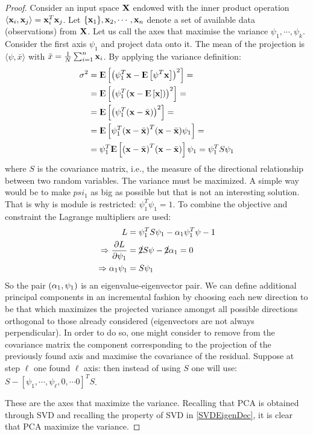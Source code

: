 \begin{theorem}{}
\label{PCAmaxVar}
\begin{proof}
Consider an input space $\mathrm{\mathbf{X}}$ endowed with the inner product operation $\langle \mathbf{x}_i, \mathbf{x}_j\rangle = \mathbf{x}_i^T \mathbf{x}_j$. Let $\{\mathbf{x}_1\}, \mathbf{x}_2, \cdots, \mathbf{x}_n$ denote a set of available data (observations) from $\mathrm{\mathbf{X}}$. Let us call the axes that maximise the variance $\psi_1, \cdots, \psi_k$. Consider the first axis $\psi_1$ and project data onto it. The mean of the projection is $\langle \psi, \bar{x}\rangle$ with $\bar{x} = \frac{1}{N} \sum_{i=1}^n \mathbf{x}_i$.
By applying the variance definition:
\begin{equation}
\begin{aligned}
\sigma^2 &= \E\left[ \br{\psi_1^T\x -\E\left[ \psi^T\x\right]}^2 \right] = \\
&= \E\left[ \br{\psi_1^T\br{\x - \E\left[\x\right]}}^2 \right] = \\
&= \E\left[ \br{\psi_1^T\br{\x - \bar{\x}}}^2 \right] = \\
&= \E\left[ \psi_1^T\br{\x - \bar{\x}}^T\br{\x - \bar{\x}}\psi_1 \right] = \\
&= \psi_1^T\E\left[ \br{\x - \bar{\x}}^T\br{\x - \bar{\x}} \right]\psi_1  =\psi_1^T S \psi_1 
\end{aligned}
\end{equation}
where $S$ is the covariance matrix, i.e., the measure of the directional relationship between two random variables.
The variance must be maximized. A simple way would be to make $psi_1$ as big as possible but that is not an interesting solution. That is why is module is restricted: $\psi_1^T \psi_1=1$. To combine the objective and constraint the Lagrange multipliers are used:
\begin{equation}
\begin{aligned}
L &= \psi_1^T S \psi_1  - \alpha_1 \psi_1^T \psi -1\\
\Rightarrow \frac{\partial L}{\partial \psi_1} &= \cancel{2}S \psi -\cancel{2} \alpha_1 = 0\\
\Rightarrow \alpha_1 \psi_1 &= S \psi_1
\end{aligned}
\end{equation}
So the pair $\left(\alpha_1, \psi_1\right)$ is an eigenvalue-eigenvector pair. We can define additional principal components in an incremental fashion by choosing each new direction to be that which maximizes the projected variance amongst all possible directions orthogonal to those already considered (eigenvectors are not always perpendicular). In order to do so, one might consider to remove from the covariance matrix the component corresponding to the projection of the previously found axis and maximise the covariance of the residual. Suppose at step $\ell$ one found $\ell$ axis: then instead of using $S$ one will use: $S-[\psi_1, \cdots, \psi_\ell, 0, \cdots 0]^T S$.

These are the axes that maximize the variance. Recalling that PCA is obtained through SVD and recalling the property of SVD in \autoref{SVDEigenDec}, it is clear that PCA maximize the variance.
\end{proof}
\end{theorem}
